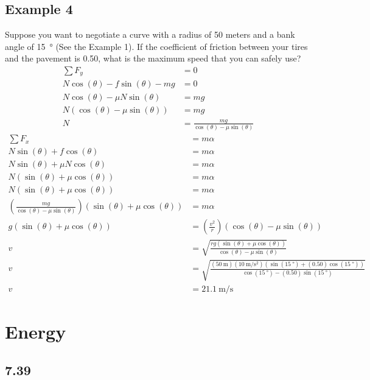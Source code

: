 \documentclass{article}
\begin{document}
\subsection{Example 4}

Suppose you want to negotiate a curve with a radius of 50 meters and a bank angle of \SI{15}{\degree} (See the Example 1). If the coefficient of friction between your tires and the pavement is 0.50, what is the maximum speed that you can safely use?
\begin{align*}
	\sum F_y & = 0 \\
	N\cos(\theta) - f\sin(\theta) - mg & = 0 \\
	N\cos(\theta) - \mu N\sin(\theta) & = mg \\
	N(\cos(\theta) - \mu \sin(\theta)) & = mg \\
	N & = \frac{ mg }{ \cos(\theta) - \mu \sin(\theta) }
\end{align*}
\begin{align*}
	\sum F_x & = m\alpha \\
	N\sin(\theta) + f\cos(\theta) & = m\alpha \\
	N\sin(\theta) + \mu N\cos(\theta) & = m\alpha \\
	N(\sin(\theta) + \mu \cos(\theta)) & = m\alpha \\
	N(\sin(\theta) + \mu \cos(\theta)) & = m\alpha \\
	\left( \frac{ mg }{ \cos(\theta) - \mu \sin(\theta) } \right)(\sin(\theta) + \mu \cos(\theta)) & = m\alpha \\
	g(\sin(\theta) + \mu \cos(\theta)) & = \left( \frac{ v^2 }{ r } \right) (\cos(\theta) - \mu \sin(\theta)) \\
	v & = \sqrt{ \frac{ rg(\sin(\theta) + \mu \cos(\theta)) }{ \cos(\theta) - \mu \sin(\theta) } } \\
	v & = \sqrt{ \frac{ (\SI{50}{\meter})(\SI{10}{\meter \per \second \squared})(\sin(\SI{15}{\degree}) + (0.50)\cos(\SI{15}{\degree})) }{ \cos(\SI{15}{\degree}) - (0.50)\sin(\SI{15}{\degree}) } } \\
	v & = \SI{21.1}{\meter \per \second}
\end{align*}

\section{Energy}

\subsection{7.39}
\end{document}
